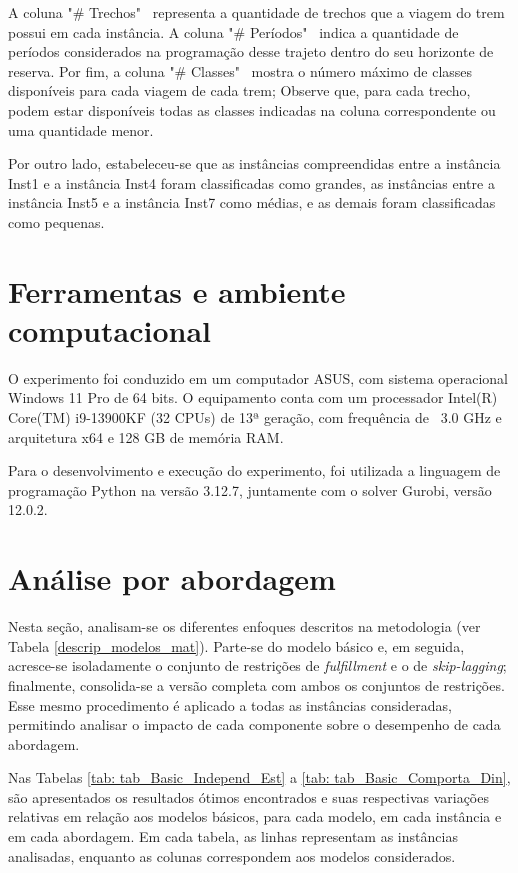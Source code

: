 A coluna "\# Trechos" \, representa a quantidade de trechos que a viagem do trem possui em cada instância. A coluna "\# Períodos" \, indica a quantidade de períodos considerados na programação desse trajeto dentro do seu horizonte de reserva. Por fim, a coluna "\# Classes" \, mostra o número máximo de classes disponíveis para cada viagem de cada trem; Observe que, para cada trecho, podem estar disponíveis todas as classes indicadas na coluna correspondente ou uma quantidade menor.

Por outro lado, estabeleceu-se que as instâncias compreendidas entre a instância Inst1 e a instância Inst4 foram classificadas como grandes, as instâncias entre a instância Inst5 e a instância Inst7 como médias, e as demais foram classificadas como pequenas.


\section{Ferramentas e ambiente computacional}
O experimento foi conduzido em um computador ASUS, com sistema operacional Windows 11 Pro de 64 bits. O equipamento conta com um processador Intel(R) Core(TM) i9-13900KF (32 CPUs) de 13ª geração, com frequência de ~3.0 GHz e arquitetura x64 e 128 GB de memória RAM.

Para o desenvolvimento e execução do experimento, foi utilizada a linguagem de programação Python na versão 3.12.7, juntamente com o solver Gurobi, versão 12.0.2.




\section{Análise por abordagem} \label{sec: Analise_por_abordagem}
Nesta seção, analisam-se os diferentes enfoques descritos na metodologia (ver Tabela \ref{descrip_modelos_mat}). Parte-se do modelo básico e, em seguida, acresce-se isoladamente o conjunto de restrições de \textit{fulfillment} e o de \textit{skip-lagging}; finalmente, consolida-se a versão completa com ambos os conjuntos de restrições. Esse mesmo procedimento é aplicado a todas as instâncias consideradas, permitindo analisar o impacto de cada componente sobre o desempenho de cada abordagem.

Nas Tabelas \ref{tab: tab_Basic_Independ_Est} a \ref{tab: tab_Basic_Comporta_Din}, são apresentados os resultados ótimos encontrados e suas respectivas variações relativas em relação aos modelos básicos, para cada modelo, em cada instância e em cada abordagem. Em cada tabela, as linhas representam as instâncias analisadas, enquanto as colunas correspondem aos modelos considerados.

